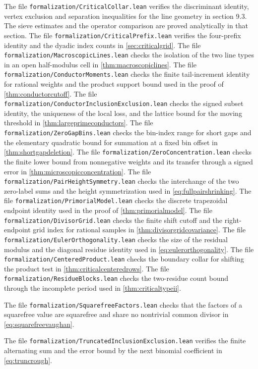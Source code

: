 \documentclass[11pt,a4paper]{article}
\numberwithin{equation}{section}
\begin{document}
The file \texttt{formalization/CriticalCollar.lean} verifies
the discriminant identity, vertex exclusion and separation
inequalities for the line geometry in section 9.3.
The sieve estimates and the operator comparison are proved
analytically in that section.
The file \texttt{formalization/CriticalPrefix.lean} verifies
the four-prefix identity and the dyadic index counts in
\cref{sec:criticalgrid}.
The file \texttt{formalization/MacroscopicLines.lean}
checks the isolation of the two line types in an open
half-modulus cell in \cref{thm:macroscopiclines}.
The file \texttt{formalization/ConductorMoments.lean}
checks the finite tail-increment identity for rational
weights and the product support bound used in the proof of
\cref{thm:conductorcutoff}.
The file \texttt{formalization/ConductorInclusionExclusion.lean}
checks the signed subset identity, the uniqueness of the
local loss, and the lattice bound for the moving threshold in
\cref{thm:largeprimeconductors}.
The file \texttt{formalization/ZeroGapBins.lean} checks the
bin-index range for short gaps and the elementary quadratic
bound for summation at a fixed bin offset in
\cref{thm:shortgapdeletion}.
The file \texttt{formalization/ZeroConcentration.lean}
checks the finite lower bound from nonnegative weights
and its transfer through a signed error in
\cref{thm:microscopicconcentration}.
The file \texttt{formalization/PairHeightSymmetry.lean}
checks the interchange of the two zero-label sums and the
height symmetrization used in \cref{eq:fullpairshrinking}.
The file \texttt{formalization/PrimorialModel.lean}
checks the discrete trapezoidal endpoint identity used
in the proof of \cref{thm:primorialmodel}.
The file \texttt{formalization/DivisorGrid.lean} checks the finite
shift cutoff and the right-endpoint grid index for rational
samples in \cref{thm:divisorgridcovariance}.
The file \texttt{formalization/EulerOrthogonality.lean} checks
the size of the residual modulus and the diagonal residue
identity used in \cref{eq:eulerorthogonality}.
The file \texttt{formalization/CenteredProduct.lean} checks
the boundary collar for shifting the product test in
\cref{thm:criticalcenteredrows}.
The file \texttt{formalization/ResidueBlocks.lean} checks
the two-residue count bound through the incomplete period
used in \cref{thm:criticaltypeii}.

The file \texttt{formalization/SquarefreeFactors.lean}
checks that the factors of a squarefree value are
squarefree and share no nontrivial common divisor
in \cref{eq:squarefreevaughan}.

The file \texttt{formalization/TruncatedInclusionExclusion.lean}
verifies the finite alternating sum and the error bound
by the next binomial coefficient in \cref{eq:truncrough}.
\end{document}
